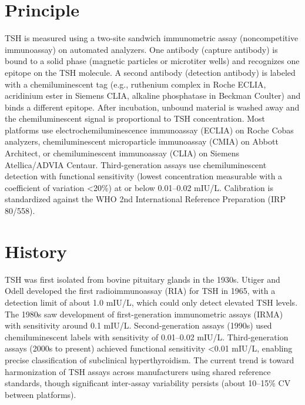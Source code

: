 \section*{Principle}
TSH is measured using a two-site sandwich immunometric assay (noncompetitive immunoassay) on automated analyzers. One antibody (capture antibody) is bound to a solid phase (magnetic particles or microtiter wells) and recognizes one epitope on the TSH molecule. A second antibody (detection antibody) is labeled with a chemiluminescent tag (e.g., ruthenium complex in Roche ECLIA, acridinium ester in Siemens CLIA, alkaline phosphatase in Beckman Coulter) and binds a different epitope. After incubation, unbound material is washed away and the chemiluminescent signal is proportional to TSH concentration. Most platforms use electrochemiluminescence immunoassay (ECLIA) on Roche Cobas analyzers, chemiluminescent microparticle immunoassay (CMIA) on Abbott Architect, or chemiluminescent immunoassay (CLIA) on Siemens Atellica/ADVIA Centaur. Third-generation assays use chemiluminescent detection with functional sensitivity (lowest concentration measurable with a coefficient of variation <20\%) at or below 0.01--0.02 mIU/L. Calibration is standardized against the WHO 2nd International Reference Preparation (IRP 80/558).

\section*{History}
TSH was first isolated from bovine pituitary glands in the 1930s. Utiger and Odell developed the first radioimmunoassay (RIA) for TSH in 1965, with a detection limit of about 1.0 mIU/L, which could only detect elevated TSH levels. The 1980s saw development of first-generation immunometric assays (IRMA) with sensitivity around 0.1 mIU/L. Second-generation assays (1990s) used chemiluminescent labels with sensitivity of 0.01--0.02 mIU/L. Third-generation assays (2000s to present) achieved functional sensitivity <0.01 mIU/L, enabling precise classification of subclinical hyperthyroidism. The current trend is toward harmonization of TSH assays across manufacturers using shared reference standards, though significant inter-assay variability persists (about 10--15\% CV between platforms).

